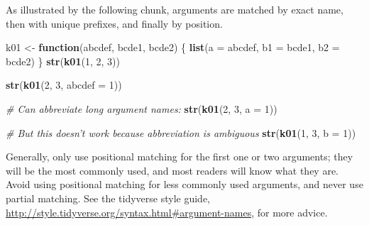 \documentclass[]{book}
\newenvironment{Shaded}{\begin{snugshade}}{\end{snugshade}}
\newcommand{\CommentTok}[1]{\textcolor[rgb]{0.56,0.35,0.01}{\textit{#1}}}
\newcommand{\ControlFlowTok}[1]{\textcolor[rgb]{0.13,0.29,0.53}{\textbf{#1}}}
\newcommand{\DataTypeTok}[1]{\textcolor[rgb]{0.13,0.29,0.53}{#1}}
\newcommand{\DecValTok}[1]{\textcolor[rgb]{0.00,0.00,0.81}{#1}}
\newcommand{\KeywordTok}[1]{\textcolor[rgb]{0.13,0.29,0.53}{\textbf{#1}}}
\newcommand{\NormalTok}[1]{#1}
\newcommand{\StringTok}[1]{\textcolor[rgb]{0.31,0.60,0.02}{#1}}
\theoremstyle{definition}
\theoremstyle{definition}
\theoremstyle{definition}
\theoremstyle{remark}
\begin{document}
As illustrated by the following chunk, arguments are matched by exact
name, then with unique prefixes, and finally by position.

\begin{Shaded}
\begin{Highlighting}[]
\NormalTok{k01 <-}\StringTok{ }\ControlFlowTok{function}\NormalTok{(abcdef, bcde1, bcde2) \{}
  \KeywordTok{list}\NormalTok{(}\DataTypeTok{a =}\NormalTok{ abcdef, }\DataTypeTok{b1 =}\NormalTok{ bcde1, }\DataTypeTok{b2 =}\NormalTok{ bcde2)}
\NormalTok{\}}
\KeywordTok{str}\NormalTok{(}\KeywordTok{k01}\NormalTok{(}\DecValTok{1}\NormalTok{, }\DecValTok{2}\NormalTok{, }\DecValTok{3}\NormalTok{))}
\end{Highlighting}
\end{Shaded}

\begin{Shaded}
\begin{Highlighting}[]
\KeywordTok{str}\NormalTok{(}\KeywordTok{k01}\NormalTok{(}\DecValTok{2}\NormalTok{, }\DecValTok{3}\NormalTok{, }\DataTypeTok{abcdef =} \DecValTok{1}\NormalTok{))}
\end{Highlighting}
\end{Shaded}

\begin{Shaded}
\begin{Highlighting}[]
\CommentTok{# Can abbreviate long argument names:}
\KeywordTok{str}\NormalTok{(}\KeywordTok{k01}\NormalTok{(}\DecValTok{2}\NormalTok{, }\DecValTok{3}\NormalTok{, }\DataTypeTok{a =} \DecValTok{1}\NormalTok{))}
\end{Highlighting}
\end{Shaded}

\begin{Shaded}
\begin{Highlighting}[]
\CommentTok{# But this doesn't work because abbreviation is ambiguous}
\KeywordTok{str}\NormalTok{(}\KeywordTok{k01}\NormalTok{(}\DecValTok{1}\NormalTok{, }\DecValTok{3}\NormalTok{, }\DataTypeTok{b =} \DecValTok{1}\NormalTok{))}
\end{Highlighting}
\end{Shaded}

Generally, only use positional matching for the first one or two
arguments; they will be the most commonly used, and most readers will
know what they are. Avoid using positional matching for less commonly
used arguments, and never use partial matching. See the tidyverse style
guide, \url{http://style.tidyverse.org/syntax.html\#argument-names}, for
more advice.
\end{document}
